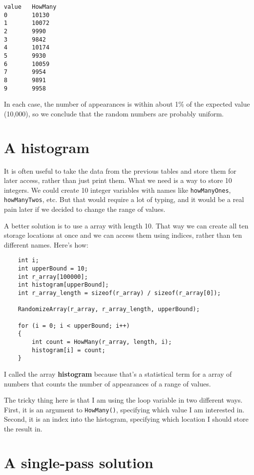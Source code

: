 \begin{verbatim}
value   HowMany
0       10130
1       10072
2       9990
3       9842
4       10174
5       9930
6       10059
7       9954
8       9891
9       9958
\end{verbatim}
%
In each case, the number of appearances is within about 1\% of
the expected value (10,000), so we conclude that the random
numbers are probably uniform.

\section {A histogram}

It is often useful to take the data from the previous tables
and store them for later access, rather than just print them.
What we need is a way to store 10 integers.  We could create
10 integer variables with names like {\tt howManyOnes},
{\tt howManyTwos}, etc.  But that would require a lot of
typing, and it would be a real pain later if we decided to
change the range of values.

A better solution is to use a array with length 10.  That
way we can create all ten storage locations at once and we
can access them using indices, rather than ten different names.
Here's how:

\begin{verbatim}
    int i;
    int upperBound = 10;
    int r_array[100000];
    int histogram[upperBound];
    int r_array_length = sizeof(r_array) / sizeof(r_array[0]);
  
    RandomizeArray(r_array, r_array_length, upperBound);

    for (i = 0; i < upperBound; i++) 
    {
        int count = HowMany(r_array, length, i);
        histogram[i] = count;
    }  
\end{verbatim}
%
I called the array {\bf histogram} because that's
a statistical term for a array of numbers that counts the
number of appearances of a range of values.


The tricky thing here is that I am using the loop variable
in two different ways.  First, it is an argument to {\tt HowMany()},
specifying which value I am interested in.  Second, it is
an index into the histogram, specifying which location I should
store the result in.

\section{A single-pass solution}

